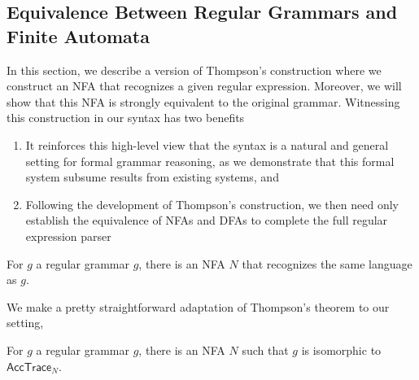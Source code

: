 \documentclass[acmsmall,screen,nonacm]{acmart}
\begin{document}
\subsection{Equivalence Between Regular Grammars and Finite Automata}
\label{subsec:eqproofs}
In this section, we describe a version of Thompson's
construction \cite{thompsonProgrammingTechniquesRegular1968}
   where we construct an NFA that recognizes a given regular
expression. Moreover, we will show that this NFA is strongly equivalent to the
original grammar. Witnessing this construction in our syntax has two benefits
\begin{enumerate}
  \item It reinforces this high-level view that the syntax is a natural and
        general setting for formal grammar reasoning, as we demonstrate that
        this formal system subsume results from existing systems, and
  \item Following the
        development of Thompson's construction, we then need
        only establish the equivalence of NFAs and DFAs to
        complete the full regular expression parser
\end{enumerate}

\begin{theorem}[Thompson]
  \label{thm:thompson}
  For $g$ a regular grammar $g$, there is an NFA $N$ that recognizes the same
  language as $g$.
\end{theorem}

We make a pretty straightforward adaptation of Thompson's theorem to our setting,

\begin{theorem}
  \label{thm:typthompson}
  For $g$ a regular grammar $g$, there is an NFA $N$ such that $g$ is isomorphic
  to $\mathsf{AccTrace}_{N}$.
\end{theorem}
\end{document}
